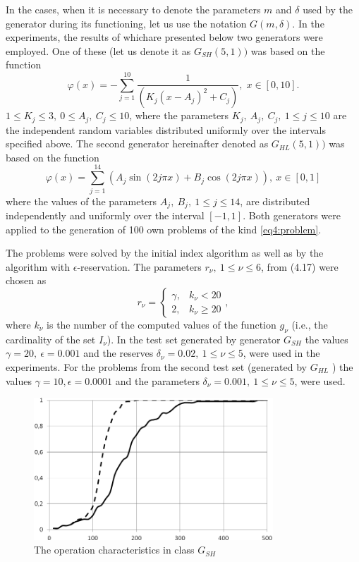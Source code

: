 In the cases, when it is necessary to denote the parameters $m$ and $\delta$ used by the generator during its functioning, let us use the notation $G ( m , \delta )$. In the experiments, the results of whichare presented below two generators were employed. One of these (let us denote it as $G_{SH} ( 5 , 1 ) )$ was based on the function
\begin{displaymath}
  \varphi(x)=-\sum_{j=1}^{10}\frac{1}{(K_j(x-A_j)^2+C_j)},\; x\in[0,10].
\end{displaymath}
$1\le K_j\le 3,\: 0\le A_j,\: C_j\le 10 $, where the parameters $K_j,\: A_j,\: C_j ,\: 1 \le j \le 10$ are the independent random variables distributed uniformly over the intervals specified above. The second generator hereinafter denoted as $G_{HL} ( 5 , 1 ) )$ was based on the function
\begin{equation}
  \varphi(x)=\sum_{j=1}^{14}(A_j\sin(2j\pi x) + B_j\cos(2j\pi x)),\: x\in[0,1]
\end{equation}
where the values of the parameters $A_j,\: B_j,\: 1 \le j \le 14$, are distributed independently and uniformly over the interval $[-1 ,1 ]$. Both generators were applied to the generation of 100 own
problems of the kind \eqref{eq4:problem}.

The problems were solved by the initial index algorithm as well as by the algorithm with $\epsilon$-reservation. The parameters $r_\nu ,\: 1 \le \nu \le 6$, from (4.17) were chosen as
\begin{displaymath}
  r_\nu = \left\{
  \begin{array}{lr}
    \gamma, & k_\nu < 20\\
    2, & k_\nu \ge 20
  \end{array}
  \right.,
\end{displaymath}
where $k_\nu$ is the number of the computed values of the function $g_\nu$ (i.e., the cardinality of the set $I_\nu$). In the test set generated by generator $G_{SH}$ the values $\gamma=20,\: \epsilon = 0.001$ and the reserves $\delta_\nu=0.02,\: 1 \le \nu \le 5$, were used in the experiments. For the problems from the second test set
(generated by $G_{HL}$ ) the values $\gamma = 10, \epsilon=0.0001$ and the parameters $\delta_\nu=0.001,\: 1 \le \nu\le 5$, were used.

\begin{figure}[ht]
  \centering
  \includegraphics[width=0.8\textwidth]{figures/4_9.png}
  \caption{The operation characteristics in class $G_{SH}$}
  \label{fig:4_9}
\end{figure}


